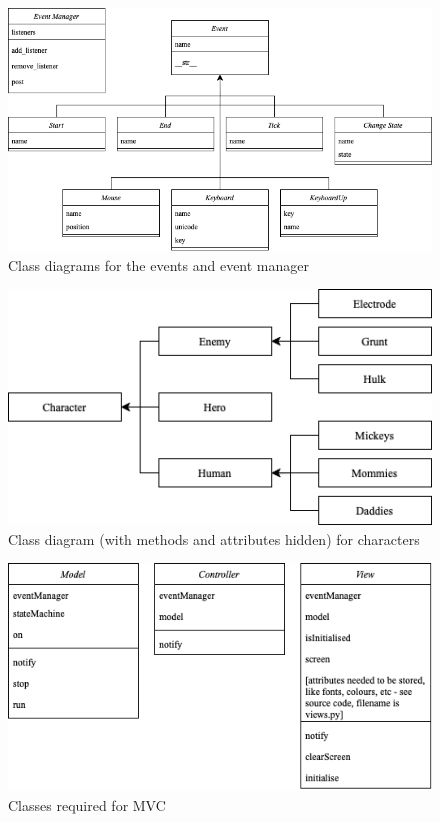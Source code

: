 \begin{figure}[H]
  \includegraphics[width=1\linewidth]{Figures/eventclass.png}
  \centering
  \caption{Class diagrams for the events and event manager}
  \label{fig:Class_Diagram_1}
\end{figure}

\begin{figure}[H]
  \includegraphics[width=0.6\linewidth]{Figures/charactersDiagram.png}
  \centering
  \caption{Class diagram (with methods and attributes hidden) for characters}
  \label{fig:Class_Diagram_2}
\end{figure}

\begin{figure}[H]
  \includegraphics[width=0.8\linewidth]{Figures/MVC0.png}
  \centering
  \caption{Classes required for MVC}
  \label{fig:Class_Diagram_3}
\end{figure}

